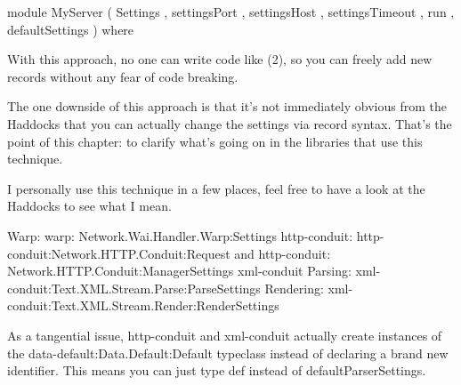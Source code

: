module MyServer
    ( Settings
    , settingsPort
    , settingsHost
    , settingsTimeout
    , run
    , defaultSettings
    ) where

With this approach, no one can write code like (2), so you can freely add new records without
any fear of code breaking.

The one downside of this approach is that it's not immediately obvious from the Haddocks that
you can actually change the settings via record syntax. That's the point of this chapter: to
clarify what's going on in the libraries that use this technique.

I personally use this technique in a few places, feel free to have a look at the Haddocks to
see what I mean.


Warp:
  warp:   Network.Wai.Handler.Warp:Settings
  http-conduit: http-conduit:Network.HTTP.Conduit:Request and
  http-conduit: Network.HTTP.Conduit:ManagerSettings
  xml-conduit   Parsing: xml-conduit:Text.XML.Stream.Parse:ParseSettings
Rendering:
  xml-conduit:Text.XML.Stream.Render:RenderSettings

As a tangential issue, http-conduit and xml-conduit actually
create instances of the data-default:Data.Default:Default typeclass instead of
declaring a brand new identifier. This means you can just type def instead of
defaultParserSettings.
